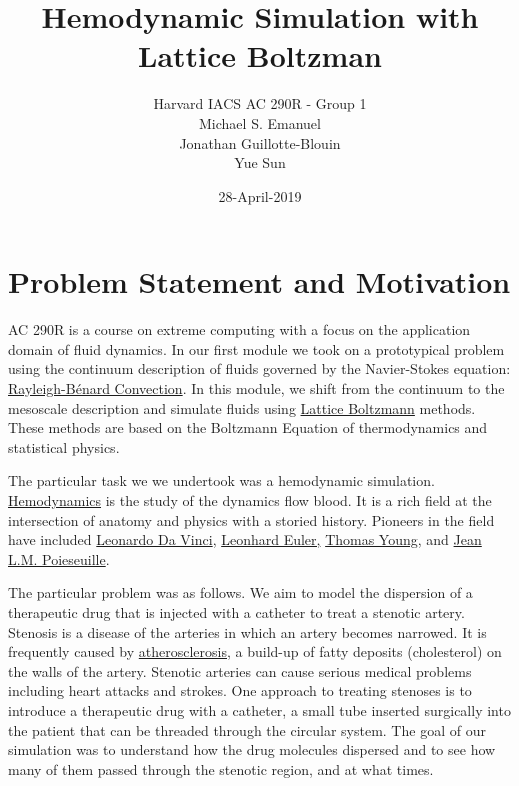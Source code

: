 \documentclass[11pt]{article} %
\title{Hemodynamic Simulation with Lattice Boltzman}
\author{Harvard IACS AC 290R - Group 1 \\
Michael S. Emanuel \\
Jonathan Guillotte-Blouin \\
Yue Sun \\
}
\date{28-April-2019}
\begin{document}
\maketitle

\section{Problem Statement and Motivation}
AC 290R is a course on extreme computing with a focus on the application domain of fluid dynamics.
In our first module we took on a prototypical problem using the continuum description of fluids
governed by the Navier-Stokes equation: 
\href{https://en.wikipedia.org/wiki/Rayleigh%E2%80%93B%C3%A9nard_convection}{Rayleigh-B\'enard Convection}.
In this module, we shift from the continuum to the mesoscale description and simulate fluids using  
\href{https://en.wikipedia.org/wiki/Lattice_Boltzmann_methods}{Lattice Boltzmann} methods.  
These methods are based on the Boltzmann Equation of thermodynamics and statistical physics.

The particular task we we undertook was a hemodynamic simulation.
\href{https://en.wikipedia.org/wiki/Hemodynamics}{Hemodynamics} is the study of the dynamics flow blood.  
It is a rich field at the intersection of anatomy and physics with a storied history.
Pioneers in the field have included 
\href{https://en.wikipedia.org/wiki/Leonardo_da_Vinci}{Leonardo Da Vinci}, 
\href{https://en.wikipedia.org/wiki/Leonhard_Euler}{Leonhard Euler,} 
\href{https://en.wikipedia.org/wiki/Thomas_Young_(scientist)}{Thomas Young}, and 
\href{https://en.wikipedia.org/wiki/Jean_L%C3%A9onard_Marie_Poiseuille}{Jean L.M. Poieseuille}.

The particular problem was as follows.  
We aim to model the dispersion of a therapeutic drug that is injected with a catheter to treat a stenotic artery.
Stenosis is a disease of the arteries in which an artery becomes narrowed.
It is frequently caused by 
\href{https://en.wikipedia.org/wiki/Atherosclerosis}{atherosclerosis}, 
a build-up of fatty deposits (cholesterol) on the walls of the artery.
Stenotic arteries can cause serious medical problems including heart attacks and strokes.
One approach to treating stenoses is to introduce a therapeutic drug with a catheter,
a small tube inserted surgically into the patient that can be threaded through the circular system.
The goal of our simulation was to understand how the drug molecules dispersed 
and to see how many of them passed through the stenotic region, and at what times.
\end{document}
